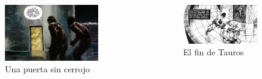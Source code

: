 \begin{frame}{}
\begin{columns}
    \begin{figure}[htb]
    \centering
        \includegraphics[width=0.8\textwidth]{img/res/11}
        \caption{Una puerta sin cerrojo}
    \end{figure}
    \begin{figure}[htb]
    \centering
        \includegraphics[width=0.9\textwidth]{img/res/12}
        \caption{El fin de Tauros}
    \end{figure}
\end{columns}
\end{frame}

